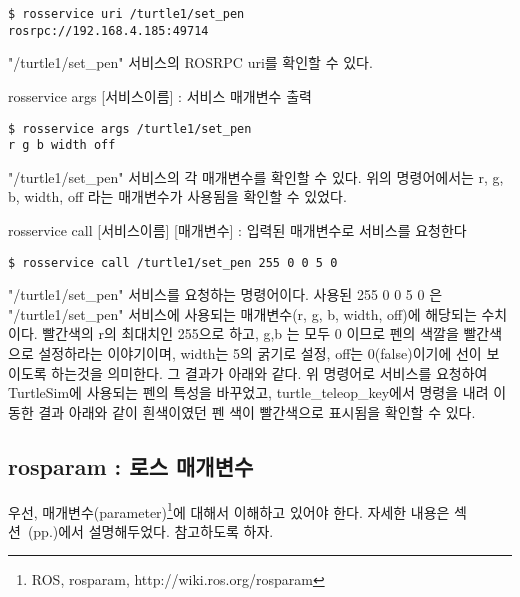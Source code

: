 \begin{lstlisting}[language=ROS]
$ rosservice uri /turtle1/set_pen
rosrpc://192.168.4.185:49714
\end{lstlisting}

\noindent
"/turtle1/set\_pen" 서비스의 ROSRPC uri를 확인할 수 있다.

\vspace{\baselineskip}
\noindent
{}\circled{\thenum} rosservice args [서비스이름] : 서비스 매개변수 출력

\begin{lstlisting}[language=ROS]
$ rosservice args /turtle1/set_pen
r g b width off
\end{lstlisting}

\noindent
"/turtle1/set\_pen" 서비스의 각 매개변수를 확인할 수 있다. 위의 명령어에서는 r, g, b, width, off 라는 매개변수가 사용됨을 확인할 수 있었다.

\vspace{\baselineskip}
\noindent
{}\circled{\thenum}  rosservice call [서비스이름] [매개변수] : 입력된 매개변수로 서비스를 요청한다

\begin{lstlisting}[language=ROS]
$ rosservice call /turtle1/set_pen 255 0 0 5 0
\end{lstlisting}

\noindent
"/turtle1/set\_pen" 서비스를 요청하는 명령어이다. 사용된 255 0 0 5 0 은 "/turtle1/set\_pen" 서비스에 사용되는 매개변수(r, g, b, width, off)에 해당되는 수치이다.  빨간색의 r의 최대치인 255으로 하고, g,b 는 모두 0 이므로 펜의 색깔을 빨간색으로 설정하라는 이야기이며, width는 5의 굵기로 설정, off는 0(false)이기에 선이 보이도록 하는것을 의미한다. 그 결과가 아래와 같다. 위 명령어로 서비스를 요청하여 TurtleSim에 사용되는 펜의 특성을 바꾸었고, turtle\_teleop\_key에서 명령을 내려 이동한 결과 아래와 같이 흰색이였던 펜 색이 빨간색으로 표시됨을 확인할 수 있다.

\subsection{rosparam : 로스 매개변수}

우선, 매개변수(parameter)\footnote{ROS, rosparam, http://wiki.ros.org/rosparam}에 대해서 이해하고 있어야 한다. 자세한 내용은 섹션~(pp.\pageref{def:RosParameter})에서 설명해두었다. 참고하도록 하자.


